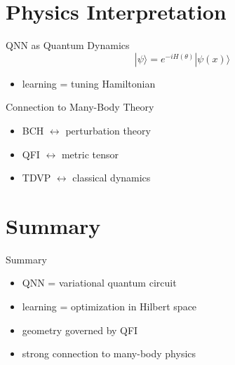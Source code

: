 \documentclass{beamer}
\begin{document}
\section{Physics Interpretation}

\begin{frame}{QNN as Quantum Dynamics}
\[
|\psi\rangle = e^{-iH(\theta)}|\psi(x)\rangle
\]

\begin{itemize}
\item learning = tuning Hamiltonian
\end{itemize}
\end{frame}


\begin{frame}{Connection to Many-Body Theory}
\begin{itemize}
\item BCH $\leftrightarrow$ perturbation theory
\item QFI $\leftrightarrow$ metric tensor
\item TDVP $\leftrightarrow$ classical dynamics
\end{itemize}
\end{frame}

\section{Summary}

\begin{frame}{Summary}
\begin{itemize}
\item QNN = variational quantum circuit
\item learning = optimization in Hilbert space
\item geometry governed by QFI
\item strong connection to many-body physics
\end{itemize}
\end{frame}
\end{document}
